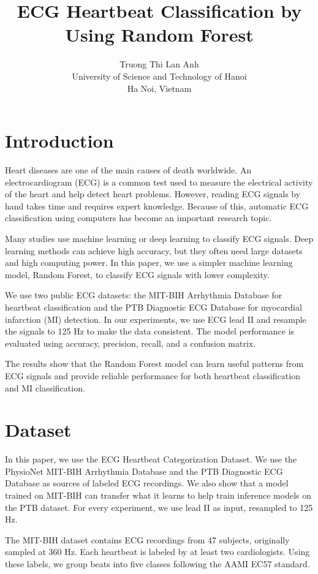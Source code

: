 \documentclass[conference]{IEEEtran}
\title{ECG Heartbeat Classification by Using Random Forest}
\author{%
Truong Thi Lan Anh\\
University of Science and Technology of Hanoi\\
Ha Noi, Vietnam
}
\begin{document}
\maketitle

\section{Introduction}
Heart diseases are one of the main causes of death worldwide. An electrocardiogram (ECG) is a common test used to measure the electrical activity of the heart and help detect heart problems. However, reading ECG signals by hand takes time and requires expert knowledge. Because of this, automatic ECG classification using computers has become an important research topic.

Many studies use machine learning or deep learning to classify ECG signals. Deep learning methods can achieve high accuracy, but they often need large datasets and high computing power. In this paper, we use a simpler machine learning model, Random Forest, to classify ECG signals with lower complexity.

We use two public ECG datasets: the MIT-BIH Arrhythmia Database for heartbeat classification and the PTB Diagnostic ECG Database for myocardial infarction (MI) detection. In our experiments, we use ECG lead II and resample the signals to 125 Hz to make the data consistent. The model performance is evaluated using accuracy, precision, recall, and a confusion matrix.

The results show that the Random Forest model can learn useful patterns from ECG signals and provide reliable performance for both heartbeat classification and MI classification.


\section{Dataset}
In this paper, we use the ECG Heartbeat Categorization Dataset. We use the PhysioNet MIT-BIH Arrhythmia Database and the PTB Diagnostic ECG Database as sources of labeled ECG recordings. We also show that a model trained on MIT-BIH can transfer what it learns to help train inference models on the PTB dataset. For every experiment, we use lead II as input, resampled to 125 Hz.

The MIT-BIH dataset contains ECG recordings from 47 subjects, originally sampled at 360 Hz. Each heartbeat is labeled by at least two cardiologists. Using these labels, we group beats into five classes following the AAMI EC57 standard.
\end{document}
